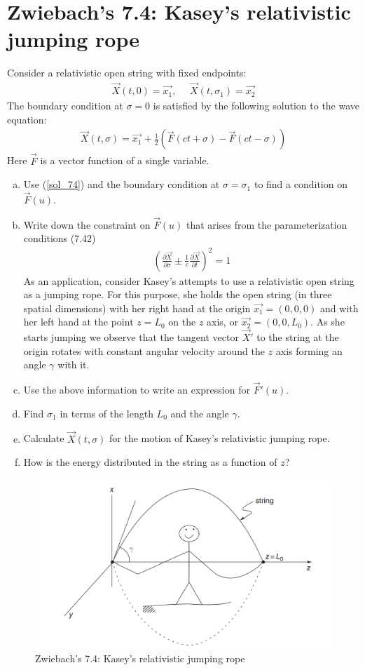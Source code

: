 \documentclass[11pt]{article}
\begin{document}
\section{Zwiebach's 7.4: Kasey's relativistic jumping rope}
Consider a relativistic open string with fixed endpoints: 
\begin{align}
    \vec{X}(t, 0) = \vec{x_1}, ~~~~~~ \vec{X}(t, \sigma_1) =\vec{x_2} \label{endpoints}
\end{align}
The boundary condition at $\sigma = 0$ is satisfied by the following solution to the wave equation: 
\begin{align}
    \vec{X}(t, \sigma) = \vec{x_1} + \frac{1}{2}\left(\vec{F}(ct + \sigma) - \vec{F}(ct - \sigma) \right) \label{sol_74}
\end{align}
Here $\vec{F}$ is a vector function of a single variable. 
\begin{enumerate} [(a)]
    \item Use (\ref{sol_74}) and the boundary condition at $\sigma = \sigma_1$ to find a condition on $\vec{F}(u)$.
    \item Write down the constraint on $\vec{F}(u)$ that arises from the parameterization conditions (7.42) 
    \begin{align*}
        \left( \frac{\partial \vec{X}}{\partial \sigma} \pm \frac{1}{c}\frac{\partial \vec{X}}{\partial t} \right)^2 =1 \tag{Zwiebach 7.42}
    \end{align*}
    As an application, consider Kasey's attempts to use a relativistic open string as a jumping rope. For this purpose, she holds the open string (in three spatial dimensions) with her right hand at the origin $\vec{x_1} = (0,0,0)$ and with her left hand at the point $z =L_0$ on the $z$ axis, or $\vec{x_2} = (0,0, L_0)$. As she starts jumping we observe that the tangent vector $\vec{X}'$ to the string at the origin rotates with constant angular velocity around the $z$ axis forming an angle $\gamma$ with it. 
    \item Use the above information to write an expression for $\vec{F}'(u)$. 
    \item Find $\sigma_1$ in terms of the length $L_0$ and the angle $\gamma$. 
    \item Calculate $\vec{X}(t, \sigma)$ for the motion of Kasey's relativistic jumping rope. 
    \item How is the energy distributed in the string as a function of $z$?
\end{enumerate}
\begin{figure}[ht]
    \centering
    \includegraphics[width=0.6\linewidth]{images/q7_4 figure.png}
    \caption{Zwiebach's 7.4: Kasey's relativistic jumping rope}
    \label{fig: q7_4}
\end{figure}
\end{document}
